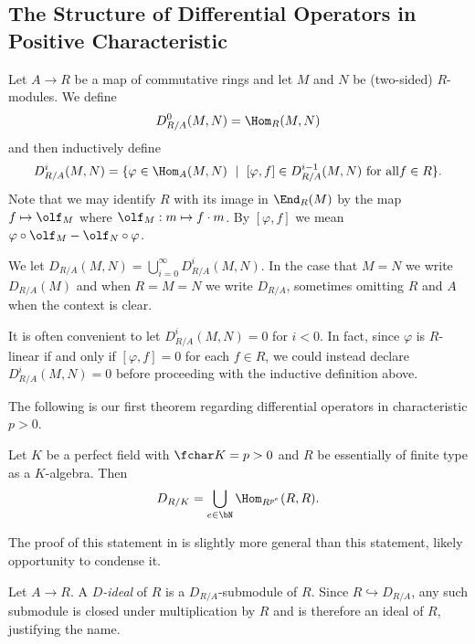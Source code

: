 \subsection{The Structure of Differential Operators in Positive Characteristic}

\begin{defn}\label{defn:diff-op-rings}
	Let $A\to R$ be a map of commutative rings and let $M$ and $N$ be (two-sided) $R$-modules. We define
	\begin{align*}
		D^0_{R/A}(M,N) = \Hom_R(M,N)
	\end{align*}
	and then inductively define
	\begin{align*}
		D^i_{R/A}(M,N) = \{\varphi \in \Hom_A(M,N) ~\mid~ [\varphi,f] \in D^{i-1}_{R/A}(M,N) ~ \text{for all} f \in R\}.
	\end{align*}
    Note that we may identify $R$ with its image in $\End_R(M)$ by the map $f \mapsto \olf_M$ where $\olf_M: m\mapsto f\cdot m$. By $[\varphi,f]$ we mean $\varphi\circ \olf_M - \olf_N\circ \varphi$.

	We let $D_{R/A}(M,N) = \bigcup_{i=0}^\infty D^{i}_{R/A}(M,N)$. In the case that $M = N$ we write $D_{R/A}(M)$ and when $R = M = N$ we write $D_{R/A}$, sometimes omitting $R$ and $A$ when the context is clear.
\end{defn}
It is often convenient to let $D^i_{R/A}(M,N) = 0$ for $i < 0$. In fact, since $\varphi$ is $R$-linear if and only if $[\varphi, f] = 0$ for each $f \in R$, we could instead declare $D^i_{R/A}(M,N) = 0$ before proceeding with the inductive definition above.

The following is our first theorem regarding differential operators in characteristic $p > 0$.

\begin{thm}\label{thm:perfect-field-diff-op}
	Let $K$ be a perfect field with $\fchar K = p > 0$ and $R$ be essentially of finite type as a $K$-algebra. Then
	\begin{align*}
		D_{R/K} = \bigcup_{e\in \bN} \Hom_{R^{p^e}}(R,R).
	\end{align*}
\end{thm}
\begin{prf}
	The proof of this statement in \cite{amon92} is slightly more general than this statement, likely opportunity to condense it.
\end{prf}

\begin{defn}\label{defn:D-ideal}
	Let $A\to R$. A \emph{$D$-ideal} of $R$ is a $D_{R/A}$-submodule of $R$. Since $R \hookrightarrow D_{R/A}$, any such submodule is closed under multiplication by $R$ and is therefore an ideal of $R$, justifying the name.
\end{defn}

